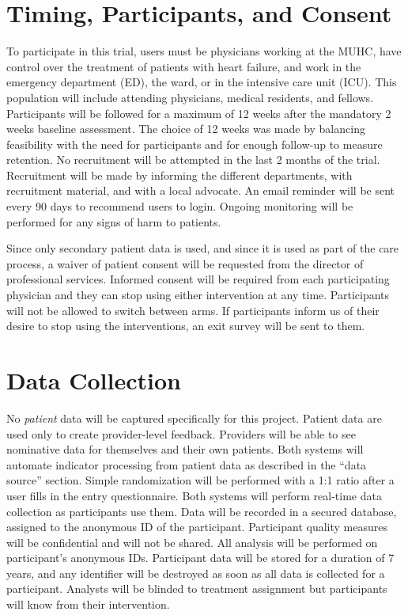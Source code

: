 \section{Timing, Participants, and Consent}
To participate in this trial, users must be physicians working at the MUHC, have control over the treatment of patients with heart failure, and work in the emergency department (ED), the ward, or in the intensive care unit (ICU). This population will include attending physicians, medical residents, and fellows. Participants will be followed for a maximum of 12 weeks after the mandatory 2 weeks baseline assessment. The choice of 12 weeks was made by balancing feasibility with the need for participants and for enough follow-up to measure retention. No recruitment will be attempted in the last 2 months of the trial. Recruitment will be made by informing the different departments, with recruitment material, and with a local advocate. An email reminder will be sent every 90 days to recommend users to login. Ongoing monitoring will be performed for any signs of harm to patients.

Since only secondary patient data is used, and since it is used as part of the care process, a waiver of patient consent will be requested from the director of professional services. Informed consent will be required from each participating physician and they can stop using either intervention at any time. Participants will not be allowed to switch between arms. If participants inform us of their desire to stop using the interventions, an exit survey will be sent to them.

\section{Data Collection}
No \textit{patient} data will be captured specifically for this project. Patient data are used only to create provider-level feedback. Providers will be able to see nominative data for themselves and their own patients. Both systems will automate indicator processing from patient data as described in the ``data source'' section. Simple randomization will be performed with a 1:1 ratio after a user fills in the entry questionnaire. Both systems will perform real-time data collection as participants use them. Data will be recorded in a secured database, assigned to the anonymous ID of the participant. Participant quality measures will be confidential and will not be shared. All analysis will be performed on participant's anonymous IDs. Participant data will be stored for a duration of 7 years, and any identifier will be destroyed as soon as all data is collected for a participant. Analysts will be blinded to treatment assignment but participants will know from their intervention.

